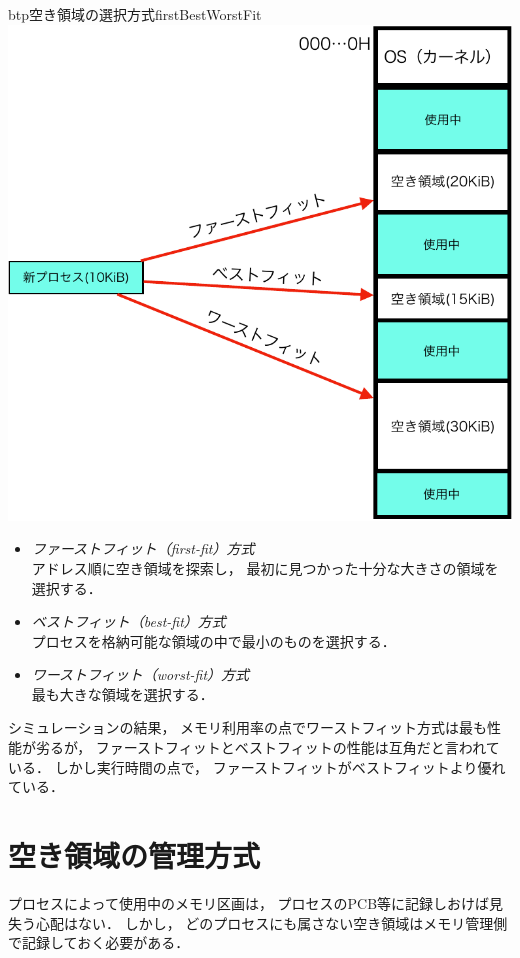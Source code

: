 \begin{myfig}{btp}{空き領域の選択方式}{firstBestWorstFit}
  \includegraphics[scale=0.66]{Fig/firstBestWorstFit-crop.pdf}
\end{myfig}

\begin{itemize}
\item \emph{ファーストフィット（first-fit）方式}\\
  アドレス順に空き領域を探索し，
  最初に見つかった十分な大きさの領域を選択する．
\item \emph{ベストフィット（best-fit）方式}\\
  プロセスを格納可能な領域の中で最小のものを選択する．
\item \emph{ワーストフィット（worst-fit）方式}\\
  最も大きな領域を選択する．
\end{itemize}

シミュレーションの結果，
メモリ利用率の点でワーストフィット方式は最も性能が劣るが，
ファーストフィットとベストフィットの性能は互角だと言われている．
しかし実行時間の点で，
ファーストフィットがベストフィットより優れている\cite{MemoryAllocation}．

\section{空き領域の管理方式}
プロセスによって使用中のメモリ区画は，
プロセスのPCB等に記録しおけば見失う心配はない．
しかし，
どのプロセスにも属さない空き領域はメモリ管理側で記録しておく必要がある．

